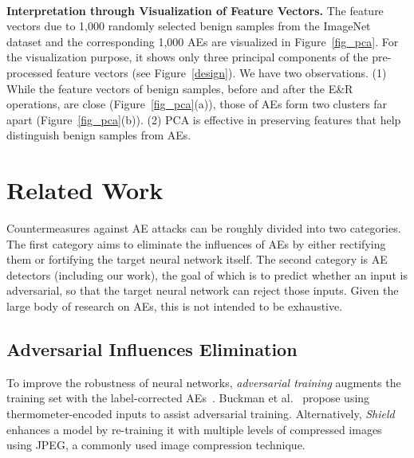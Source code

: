 \documentclass[sigconf]{acmart}
\newcommand{\af}{\vspace*{-3pt}}
\begin{document}
\begin{figure*} \centering
{}
\ \ \ \ \ \ 
\af
\caption{Visualization of feature vectors. The coordinate axes respectively represent three largest principal components.}\label{fig_pca} 
\end{figure*}

\vspace{3pt}
\noindent \textbf{Interpretation through Visualization of Feature Vectors.}
The feature vectors due to 1,000 randomly selected benign samples from the
ImageNet dataset and the corresponding 1,000 AEs are visualized in Figure~\ref{fig_pca}.
For the visualization purpose, it shows only three principal components of the pre-processed feature vectors (see Figure~\ref{design}). We have two observations. (1) While the feature vectors of benign
samples, before and after the E\&R operations, are
close (Figure~\ref{fig_pca}(a)), 
those of AEs form two clusters
far apart (Figure~\ref{fig_pca}(b)). 
(2) PCA is effective in preserving features that help
distinguish benign samples from AEs.

\section{Related Work}\label{sec:relate}

Countermeasures against AE attacks can be roughly divided into two categories. The first category aims to eliminate the inﬂuences of AEs by either rectifying them or fortifying the target neural network itself. The second category is AE detectors (including our work), the goal of which is to predict whether an input is adversarial,
so that the target neural network can reject those inputs. Given the large body of research on AEs, this is not intended to be exhaustive.

\subsection{Adversarial Influences Elimination}

To improve the robustness of neural networks, \emph{adversarial training} augments the training set with the label-corrected AEs~\cite{zheng2016improving,madry2018towards}. Buckman et al.~\cite{buckman2018thermometer} propose using thermometer-encoded inputs to assist adversarial training. 
Alternatively, \emph{Shield}~\cite{das2018shield} enhances a model by re-training it with multiple levels of compressed images using JPEG, a commonly used image compression technique. 
\end{document}
